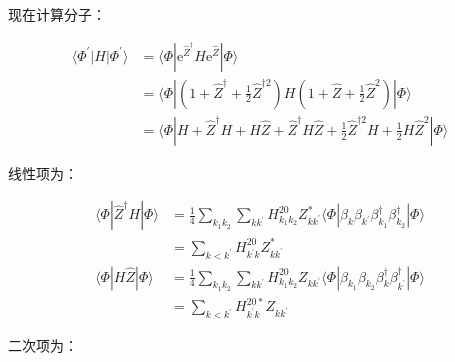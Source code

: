 \begin{booknote*}
现在计算分子：

\begin{align*}
\langle\Phi^{\prime}|H|\Phi^{\prime}\rangle & =\langle\Phi|\mathrm{e}^{\hat{Z}^{\dagger}}H\mathrm{e}^{\hat{Z}}|\Phi\rangle\\
 & =\langle\Phi|(1+\hat{Z}^{\dagger}+\frac{1}{2}\hat{Z}^{\dagger2})H(1+\hat{Z}+\frac{1}{2}\hat{Z}^{2})|\Phi\rangle\\
 & =\langle\Phi|H+\hat{Z}^{\dagger}H+H\hat{Z}+\hat{Z}^{\dagger}H\hat{Z}+\frac{1}{2}\hat{Z}^{\dagger2}H+\frac{1}{2}H\hat{Z}^{2}|\Phi\rangle
\end{align*}

线性项为：

\begin{align*}
\langle\Phi|\hat{Z}^{\dagger}H|\Phi\rangle & =\frac{1}{4}\sum_{k_{1}k_{2}}\sum_{kk^{\prime}}H^{20}_{k_{1}k_{2}}Z^{*}_{kk^{\prime}}\langle\Phi|\beta_{k}\beta_{k^{\prime}}\beta^{\dagger}_{k_{1}}\beta^{\dagger}_{k_{2}}|\Phi\rangle\\
 & =\sum_{k<k^{\prime}}H^{20}_{k^{\prime}k}Z^{*}_{kk^{\prime}}\\
\langle\Phi|H\hat{Z}|\Phi\rangle & =\frac{1}{4}\sum_{k_{1}k_{2}}\sum_{kk^{\prime}}H^{20}_{k_{1}k_{2}}Z_{kk^{\prime}}\langle\Phi|\beta_{k_{1}}\beta_{k_{2}}\beta^{\dagger}_{k}\beta^{\dagger}_{k^{\prime}}|\Phi\rangle\\
 & =\sum_{k<k^{\prime}}H^{20*}_{k^{\prime}k}Z_{kk^{\prime}}
\end{align*}

二次项为：


\end{booknote*}
